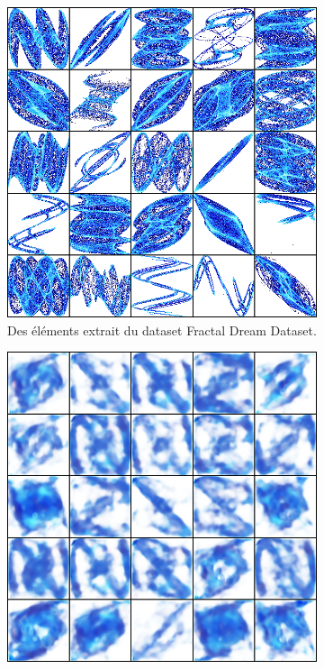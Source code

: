 \documentclass[11pt,francais]{article}
\begin{document}
\begin{figure}[!h]
    \centering
    \begin{subfigure}[b]{0.32\textwidth}
        \includegraphics[width=\textwidth]{Figures/ComparaisonLS/dataset_sample.png}
        \caption{Des éléments extrait du dataset Fractal Dream Dataset.}
    \end{subfigure}
    \begin{subfigure}[b]{0.32\textwidth}
        \includegraphics[width=\textwidth]{Figures/ComparaisonLS/scan7_eps0,1_lrelu0,01_0.png}

\end{subfigure}
\end{figure}
\end{document}
